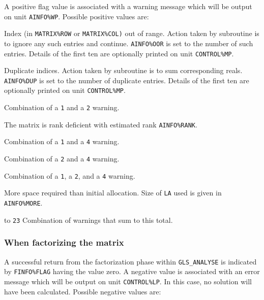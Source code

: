 \documentclass{galahad}
\newcommand{\packagename}{GLS}
\begin{document}
\noindent
A positive flag value is associated with a warning message
which will  be output on unit {\tt AINFO\%WP}. Possible positive values are:
\begin{description}

 Index (in {\tt MATRIX\%ROW} or {\tt MATRIX\%COL)} out of range. 
Action taken by subroutine is to ignore any such entries and
continue. {\tt AINFO\%OOR} is set to the number of such entries. Details
of the first ten are optionally printed on unit {\tt CONTROL\%MP}.

 Duplicate indices.
Action taken by subroutine is to sum corresponding reals.
{\tt AINFO\%DUP} is set to the number of duplicate entries.  Details of the
first ten are optionally printed on unit {\tt CONTROL\%MP}.

 Combination of a {\tt 1} and a {\tt 2} warning.

 The matrix is rank deficient with estimated rank {\tt AINFO\%RANK}.

 Combination of a {\tt 1} and a {\tt 4} warning.

 Combination of a {\tt 2} and a {\tt 4} warning.

 Combination of a {\tt 1}, a {\tt 2}, and a {\tt 4} warning.

 More space required than initial allocation.  
Size of {\tt LA} used is given in {\tt AINFO\%MORE}.

 to {\tt 23} Combination of warnings that sum to this total.

\end{description}

\subsubsection{When factorizing the matrix} \label{errorf}

A successful return from the factorization phase within 
{\tt \packagename\_ANALYSE} 
is indicated by {\tt FINFO\%FLAG} having the value zero.
A negative value is associated with an error message which will be
output on unit {\tt CONTROL\%LP}. In this case, no solution will have
been calculated.  Possible negative values are:
\end{document}
